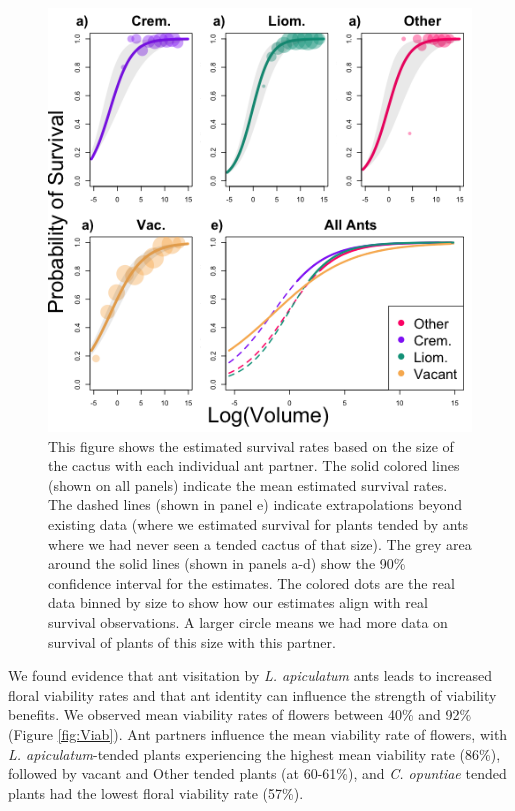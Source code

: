 \documentclass[11pt]{article}
\begin{document}
\begin{figure}[H]
\includegraphics[width=0.95\linewidth]{Figures/survival_plot.png}
\caption{This figure shows the estimated survival rates based on the size of the cactus with each individual ant partner. The solid colored lines (shown on all panels) indicate the mean estimated survival rates. The dashed lines (shown in panel e) indicate extrapolations beyond existing data (where we estimated survival for plants tended by ants where we had never seen a tended cactus of that size). The grey area around the solid lines (shown in panels a-d) show the 90\% confidence interval for the estimates. The colored dots are the real data binned by size to show how our estimates align with real survival observations. A larger circle means we had more data on survival of plants of this size with this partner.}
\label{fig:Surv}
\end{figure}

We found evidence that ant visitation by \textit{L. apiculatum} ants leads to increased floral viability rates and that ant identity can influence the strength of viability benefits.
We observed mean viability rates of flowers between 40\% and 92\% (Figure \ref{fig:Viab}).
Ant partners influence the mean viability rate of flowers, with \textit{L. apiculatum}-tended plants experiencing the highest mean viability rate (86\%), followed by vacant and Other tended plants (at 60-61\%), and \textit{C. opuntiae} tended plants had the lowest floral viability rate (57\%).
\end{document}
